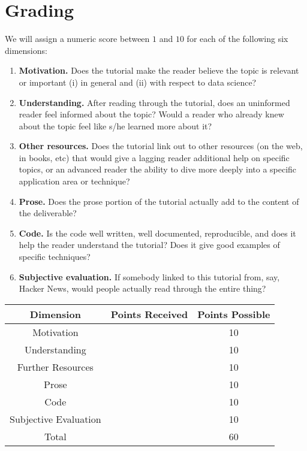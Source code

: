\documentclass[11pt]{article}
\begin{document}
\section{Grading}
We will assign a numeric score between $1$ and $10$ for each of the following six dimensions:
\begin{enumerate}
\item \textbf{Motivation.}  Does the tutorial make the reader believe the topic is relevant or important (i) in general and (ii) with respect to data science?
\item \textbf{Understanding.}  After reading through the tutorial, does an uninformed reader feel informed about the topic?  Would a reader who already knew about the topic feel like s/he learned more about it?
\item \textbf{Other resources.}  Does the tutorial link out to other resources (on the web, in books, etc) that would give a lagging reader additional help on specific topics, or an advanced reader the ability to dive more deeply into a specific application area or technique?
\item \textbf{Prose.}  Does the prose portion of the tutorial actually add to the content of the deliverable?
\item \textbf{Code.}  Is the code well written, well documented, reproducible, and does it help the reader understand the tutorial?  Does it give good examples of specific techniques?
\item \textbf{Subjective evaluation.}  If somebody linked to this tutorial from, say, Hacker News, would people actually read through the entire thing?
\end{enumerate}

\begin{center}{\Large
\begin{tabular}{ccc}
\toprule
Dimension & Points Received & Points Possible\\\midrule
Motivation & & 10\\
Understanding & & 10\\
Further Resources & & 10\\
Prose & & 10\\
Code & & 10\\
Subjective Evaluation & & 10\\\midrule
Total & & 60\\\bottomrule
\end{tabular}%
}
\end{center}
\end{document}
